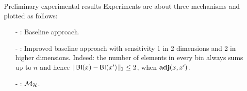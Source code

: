 \documentclass[final,hyperref={pdfpagelabels=false}]{beamer}
\begin{document}
\begin{frame}[t]
\begin{columns}[t]
\begin{column}{.485\textwidth}
  \begin{block}{Preliminary experimental results}
    Experiments are about three mechanisms and plotted as follows:
\begin{itemize}
  \item[-] {\textbf{\color{green}{Green}}}: Baseline approach. %
  \item[-] {\textbf{\color{red}{Red}}}: Improved baseline approach with sensitivity 1 in 2 dimensions and 2 in higher dimensions.
    Indeed: the number of elements in every bin always sums up to $n$ and hence $||\mathsf{BI}(x)-\mathsf{BI}(x')||_1\leq 2$, when $\textbf{adj}(x,x')$.
    
  \item[-] {\textbf{\color{blue}{Blue}}}: $\mathcal{M}_{\mathcal{H}}$.
\end{itemize}
\begin{figure}[H]
\begin{center}
\centering


\end{center}
\end{figure}
\end{block}
\end{column}
\end{columns}
\end{frame}
\end{document}
